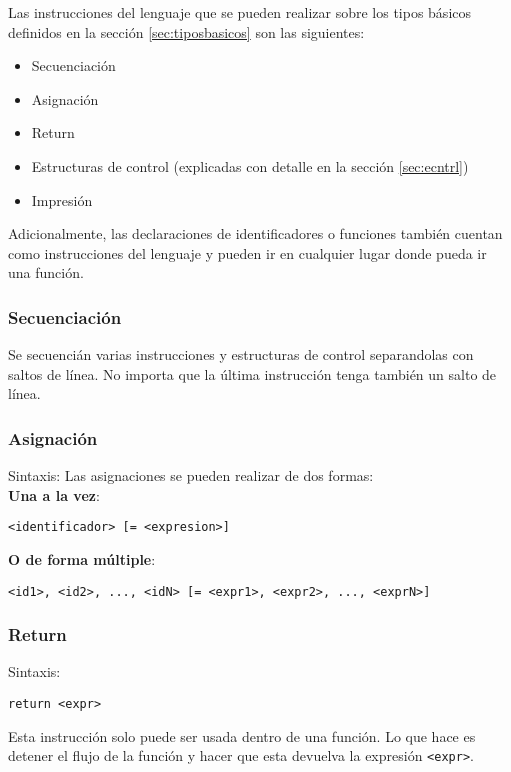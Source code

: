 \documentclass[12pt, spanish]{report}
\begin{document}
Las instrucciones del lenguaje que se pueden realizar sobre los tipos
básicos definidos en la sección \ref{sec:tiposbasicos} son las siguientes:

\begin{itemize}
\item Secuenciación
\item Asignación
\item Return
\item Estructuras de control (explicadas con detalle en la sección \ref{sec:ecntrl})
\item Impresi\'on
\end{itemize}

Adicionalmente, las declaraciones de identificadores o funciones
también cuentan como instrucciones del lenguaje y pueden ir en cualquier
lugar donde pueda ir una funci\'on.

\subsubsection{Secuenciaci\'on}
Se secuenci\'an varias instrucciones y estructuras de control separandolas con saltos
de l\'inea. No importa que la \'ultima instrucci\'on tenga
tambi\'en un salto de l\'inea.

\subsubsection{Asignaci\'on}
Sintaxis:
Las asignaciones se pueden realizar de dos formas:\\

\textbf{Una a la vez}:
\begin{verbatim}
<identificador> [= <expresion>]
\end{verbatim}

\textbf{O de forma múltiple}:
\begin{verbatim}
<id1>, <id2>, ..., <idN> [= <expr1>, <expr2>, ..., <exprN>]
\end{verbatim}

\subsubsection{Return}
\label{sec:return}
Sintaxis:
\begin{verbatim}
return <expr>
\end{verbatim}

Esta instrucci\'on solo puede ser usada dentro de una funci\'on. Lo
que hace es detener el flujo de la funci\'on y hacer que esta devuelva
la expresión \texttt{<expr>}.
\end{document}
